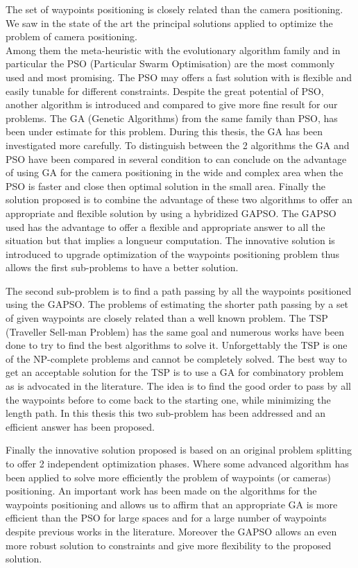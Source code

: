The set of waypoints positioning is closely related than the camera positioning. We saw in the state of the art the principal solutions applied to optimize the problem of camera positioning.\\
Among them the meta-heuristic with the evolutionary algorithm family and in particular the PSO (Particular Swarm Optimisation) are the most commonly used and most promising.
 The PSO may offers a fast solution with is flexible and easily tunable for different constraints. Despite the great potential of PSO, another algorithm is introduced and compared to give more fine result for our problems.
The GA (Genetic Algorithms) from the same family than PSO, has been under estimate for this problem. During this thesis, the GA has been investigated more carefully. 
To distinguish between the 2 algorithms the GA and PSO have been compared in several condition to can conclude on the advantage of using GA for the camera positioning in the wide and complex area when the PSO is faster and close then optimal solution in the small area.
Finally the solution proposed is to combine the advantage of these two algorithms to offer an appropriate and flexible solution by using a hybridized GAPSO. 
The GAPSO used has the advantage to offer a flexible and appropriate answer to all the situation but that implies a longueur computation. 
The innovative solution is introduced to upgrade optimization of the waypoints positioning problem thus allows the first sub-problems to have a better solution.

The second sub-problem is to find a path passing by all the waypoints positioned using the GAPSO. The problems of estimating the shorter path passing by a set of given waypoints are closely related than a well known problem. The TSP (Traveller Sell-man Problem) has the same goal and numerous works have been done to try to find the best algorithms to solve it. Unforgettably the TSP is one of the NP-complete problems and cannot be completely solved. The best way to get an acceptable solution for the TSP is to use a GA for combinatory problem as is advocated in the literature. 
The idea is to find the good order to pass by all the waypoints before to come back to the starting one, while  minimizing the length path. 
In this thesis this two sub-problem has been addressed and an efficient answer has been proposed. 

Finally the innovative solution proposed is based on an original problem splitting to offer 2 independent optimization phases. Where some advanced algorithm has been applied to solve more efficiently the problem of waypoints (or cameras) positioning. An important work has been made on the algorithms for the waypoints positioning and allows us to affirm that an appropriate GA is more efficient than the PSO for large spaces and for a large number of waypoints despite previous works in the literature. Moreover the GAPSO allows an even more robust solution to constraints and give more flexibility to the proposed solution. 

